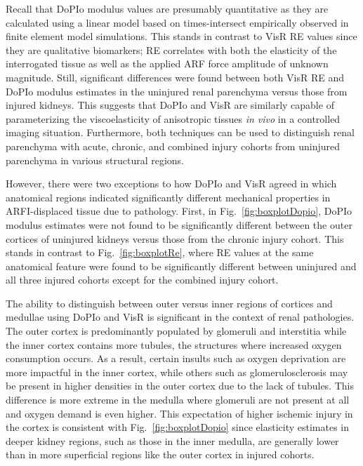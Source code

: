 Recall that DoPIo modulus values are presumably quantitative as they are calculated using a linear model based on times-intersect empirically observed in finite element model simulations. This stands in contrast to VisR RE values since they are qualitative biomarkers; RE correlates with both the elasticity of the interrogated tissue as well as the applied ARF force amplitude of unknown magnitude. Still, significant differences were found between both VisR RE and DoPIo modulus estimates in the uninjured renal parenchyma versus those from injured kidneys. This suggests that DoPIo and VisR are similarly capable of parameterizing the viscoelasticity of anisotropic tissues \emph{in vivo} in a controlled imaging situation. Furthermore, both techniques can be used to distinguish renal parenchyma with acute, chronic, and combined injury cohorts from uninjured parenchyma in various structural regions.

However, there were two exceptions to how DoPIo and VisR agreed in which anatomical regions indicated significantly different mechanical properties in ARFI-displaced tissue due to pathology. First, in Fig.~\ref{fig:boxplotDopio}, DoPIo modulus estimates were not found to be significantly different between the outer cortices of uninjured kidneys versus those from the chronic injury cohort. This stands in contrast to Fig.~\ref{fig:boxplotRe}, where RE values at the same anatomical feature were found to be significantly different between uninjured and all three injured cohorts except for the combined injury cohort.

The ability to distinguish between outer versus inner regions of cortices and medullae using DoPIo and VisR is significant in the context of renal pathologies. The outer cortex is predominantly populated by glomeruli and interstitia while the inner cortex contains more tubules, the structures where increased oxygen consumption occurs. As a result, certain insults such as oxygen deprivation are more impactful in the inner cortex, while others such as glomerulosclerosis may be present in higher densities in the outer cortex due to the lack of tubules. This difference is more extreme in the medulla where glomeruli are not present at all and oxygen demand is even higher. This expectation of higher ischemic injury in the cortex is consistent with Fig.~\ref{fig:boxplotDopio} since elasticity estimates in deeper kidney regions, such as those in the inner medulla, are generally lower than in more superficial regions like the outer cortex in injured cohorts.

